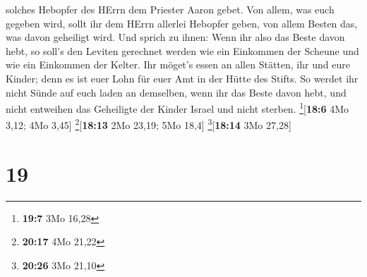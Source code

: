 solches Hebopfer des HErrn dem Priester Aaron gebet.  Von
allem, was euch gegeben wird, sollt ihr dem HErrn allerlei Hebopfer
geben, von allem Besten das, was davon geheiligt wird. 
Und sprich zu ihnen: Wenn ihr also das Beste davon hebt, so soll's den
Leviten gerechnet werden wie ein Einkommen der Scheune und wie ein
Einkommen der Kelter.  Ihr möget's essen an allen
Stätten, ihr und eure Kinder; denn es ist euer Lohn für euer Amt in der
Hütte des Stifts.  So werdet ihr nicht Sünde auf euch
laden an demselben, wenn ihr das Beste davon hebt, und nicht entweihen
das Geheiligte der Kinder Israel und nicht sterben.
\footnote{\textbf{19:7} 3Mo 16,28}{[}\textbf{18:6} 4Mo 3,12; 4Mo 3,45{]}
\footnote{\textbf{20:17} 4Mo 21,22}{[}\textbf{18:13} 2Mo 23,19; 5Mo
18,4{]} \footnote{\textbf{20:26} 3Mo 21,10}{[}\textbf{18:14} 3Mo
27,28{]}

\hypertarget{section-18}{%
\section{19}\label{section-18}}

